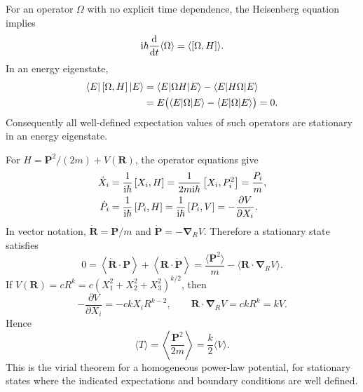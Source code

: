For an operator $\Omega$ with no explicit time dependence, the
Heisenberg equation implies
\[
 \mathrm{i}\hbar\frac{\mathop{}\!\mathrm{d}}{\mathop{}\!\mathrm{d} t}\langle\Omega\rangle
 =\langle\left[\Omega,H\right]\rangle.
\]
In an energy eigenstate,
\begin{align*}
 \langle E\rvert \left[\Omega,H\right]\lvert E\rangle
 &=\langle E\rvert \Omega H\lvert E\rangle-\langle E\rvert H\Omega\lvert E\rangle\\
 &=E\bigl(\langle E\rvert \Omega\lvert E\rangle-\langle E\rvert \Omega\lvert E\rangle\bigr)=0.
\end{align*}
Consequently all well-defined expectation values of such operators are
stationary in an energy eigenstate.

For $H=\mathbf P^2/(2m)+V(\mathbf R)$, the operator equations give
\begin{align*}
 \dot X_i&=\frac1{\mathrm{i}\hbar}\left[X_i,H\right]
   =\frac1{2m\mathrm{i}\hbar}\left[X_i,P_i^2\right]=\frac{P_i}{m},\\
 \dot P_i&=\frac1{\mathrm{i}\hbar}\left[P_i,H\right]
   =\frac1{\mathrm{i}\hbar}\left[P_i,V\right]
   =-\frac{\partial V}{\partial X_i}.
\end{align*}
In vector notation, $\dot{\mathbf R}=\mathbf P/m$ and
$\dot{\mathbf P}=-\boldsymbol\nabla_RV$. Therefore a stationary state
satisfies
\[
 0=\left\langle\dot{\mathbf R}\cdot\mathbf P\right\rangle
   +\left\langle\mathbf R\cdot\dot{\mathbf P}\right\rangle
 =\frac{\langle\mathbf P^2\rangle}{m}
  -\langle\mathbf R\cdot\boldsymbol\nabla_RV\rangle.
\]
If $V(\mathbf R)=cR^k=c(X_1^2+X_2^2+X_3^2)^{k/2}$, then
\[
 -\frac{\partial V}{\partial X_i}=-ckX_iR^{k-2},\qquad
 \mathbf R\cdot\boldsymbol\nabla_RV=ckR^k=kV.
\]
Hence
\[
 \boxed{\langle T\rangle
 =\left\langle\frac{\mathbf P^2}{2m}\right\rangle
 =\frac{k}{2}\langle V\rangle.}
\]
This is the virial theorem for a homogeneous power-law potential,
for stationary states where the indicated expectations and boundary
conditions are well defined.

